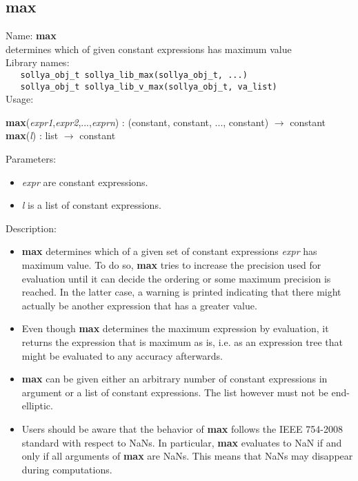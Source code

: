 \subsection{max}
\label{labmax}
\noindent Name: \textbf{max}\\
\phantom{aaa}determines which of given constant expressions has maximum value\\[0.2cm]
\noindent Library names:\\
\verb|   sollya_obj_t sollya_lib_max(sollya_obj_t, ...)|\\
\verb|   sollya_obj_t sollya_lib_v_max(sollya_obj_t, va_list)|\\[0.2cm]
\noindent Usage: 
\begin{center}
\textbf{max}(\emph{expr1},\emph{expr2},...,\emph{exprn}) : (\textsf{constant}, \textsf{constant}, ..., \textsf{constant}) $\rightarrow$ \textsf{constant}\\
\textbf{max}(\emph{l}) : \textsf{list} $\rightarrow$ \textsf{constant}\\
\end{center}
Parameters: 
\begin{itemize}
\item \emph{expr} are constant expressions.
\item \emph{l} is a list of constant expressions.
\end{itemize}
\noindent Description: \begin{itemize}

\item \textbf{max} determines which of a given set of constant expressions
   \emph{expr} has maximum value. To do so, \textbf{max} tries to increase the
   precision used for evaluation until it can decide the ordering or some
   maximum precision is reached. In the latter case, a warning is printed
   indicating that there might actually be another expression that has a
   greater value.

\item Even though \textbf{max} determines the maximum expression by evaluation, it 
   returns the expression that is maximum as is, i.e. as an expression
   tree that might be evaluated to any accuracy afterwards.

\item \textbf{max} can be given either an arbitrary number of constant
   expressions in argument or a list of constant expressions. The list
   however must not be end-elliptic.

\item Users should be aware that the behavior of \textbf{max} follows the IEEE
   754-2008 standard with respect to NaNs. In particular, \textbf{max}
   evaluates to NaN if and only if all arguments of \textbf{max} are
   NaNs. This means that NaNs may disappear during computations.
\end{itemize}
